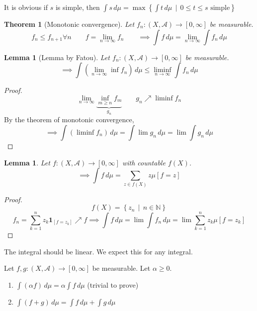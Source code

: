 \documentclass[a4paper]{article}
\newcounter{lecref}[section]
\numberwithin{lecref}{section}
\theoremstyle{break}
\newtheorem*{Theorem}{Theorem}
\newtheorem{lemma}[lecref]{Lemma}
\newtheorem*{Lemma}{Lemma}
\newcommand{\SetDef}[2]{\left\{#1\,\mid\,#2\right\}}
\begin{document}
It is obvious if $s$ is simple, then $\int s \, d\mu = \max\SetDef{\int t \, d\mu}{0 \leq t \leq s \text{ simple}}$

\begin{Theorem}[Monotonic convergence]
  Let $f_n: (X, \mathcal A) \to [0, \infty]$ be measurable.
  \[ f_n \leq f_{n+1} \forall n \qquad f = \lim_{n\to\infty} f_n \qquad \implies \int f \, d\mu = \lim_{n\to\infty} \int f_n \, d\mu \]
\end{Theorem}

\begin{Lemma}[Lemma by Fatou]
  Let $f_n: (X, \mathcal A) \to [0, \infty]$ be measurable.
  \[ \implies \int \left(\lim_{n\to\infty} \inf{f_n}\right) \, d\mu \leq \liminf_{n\to\infty} \int f_n \, d\mu \]
\end{Lemma}

\begin{proof}
  \[ \lim_{n\to\infty} \underbrace{\inf_{m \geq n} f_m}_{g_n} \qquad g_n \nearrow \liminf f_n \]
  By the theorem of monotonic convergence,
  \[ \implies \int \left(\liminf f_n\right) \, d\mu = \int \lim{g_n} \, d\mu = \lim \int g_n \, d\mu \]
\end{proof}

\begin{lemma}
  Let $f: (X, \mathcal A) \to [0, \infty]$ with countable $f(X)$.
  \[ \implies \int f \, d\mu = \sum_{z \in f(X)} z \mu[f = z] \]
\end{lemma}

\begin{proof}
  \[ f(X) = \SetDef{z_n}{n \in \mathbb N} \]
  \[ f_n = \sum_{k=1}^n z_k \mathbf{1}_{[f = z_k]} \nearrow f \implies \int f \, d\mu = \lim \int f_n \, d\mu = \lim \sum_{k=1}^n z_k \mu[f = z_k] \]
\end{proof}

The integral should be linear. We expect this for any integral.

\begin{theorem}
  Let $f, g: (X, \mathcal A) \to [0, \infty]$ be measurable. Let $\alpha \geq 0$.
  \begin{enumerate}
    \item $\int (\alpha f) \, d\mu = \alpha \int f \, d\mu$ (trivial to prove)
    \item $\int (f + g) \, d\mu = \int f \, d\mu + \int g \, d\mu$
  \end{enumerate}
\end{theorem}
\end{document}
